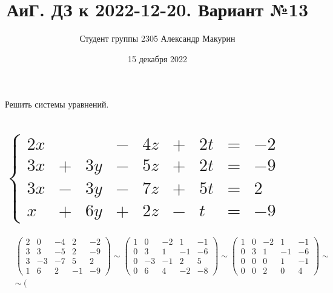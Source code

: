 \documentclass[12pt]{article}
\title{АиГ. ДЗ к 2022-12-20. Вариант №13}
\author{Студент группы 2305 Александр Макурин}
\date{15 декабря 2022}
\begin{document}
\maketitle

\begin{sloppypar}

    Решить системы уравнений.
    \section{$
          \left\{\begin{array}{rcrcrcrcr}
              2x &   &    & - & 4z & + & 2t & = & -2 \\
              3x & + & 3y & - & 5z & + & 2t & = & -9 \\
              3x & - & 3y & - & 7z & + & 5t & = & 2  \\
              x  & + & 6y & + & 2z & - & t  & = & -9
          \end{array}\right.
      $}
    \begin{align*}
         & \left(\begin{array}{rrrr|r}
                         2 & 0  & -4 & 2  & -2 \\
                         3 & 3  & -5 & 2  & -9 \\
                         3 & -3 & -7 & 5  & 2  \\
                         1 & 6  & 2  & -1 & -9
                     \end{array}\right) \sim
        \left(\begin{array}{rrrr|r}
                      1 & 0  & -2 & 1  & -1 \\
                      0 & 3  & 1  & -1 & -6 \\
                      0 & -3 & -1 & 2  & 5  \\
                      0 & 6  & 4  & -2 & -8
                  \end{array}\right) \sim
        \left(\begin{array}{rrrr|r}
                      1 & 0 & -2 & 1  & -1 \\
                      0 & 3 & 1  & -1 & -6 \\
                      0 & 0 & 0  & 1  & -1 \\
                      0 & 0 & 2  & 0  & 4
                  \end{array}\right) \sim     \\
         & \sim\left(\begin{array}{rrrr|r}

\end{array}
\end{align*}
\end{sloppypar}
\end{document}
